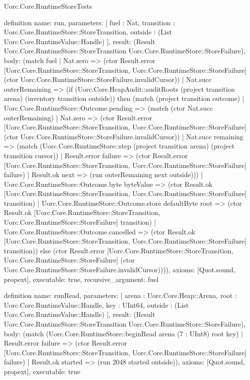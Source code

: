 \begin{lexlean}{Uorc.Core.RuntimeStoreTests}
\begin{semanticmodule}
definition{
  name: run,
  parameters: [
    fuel : Nat,
    transition : Uorc.Core.RuntimeStore::StoreTransition,
    outside : (List Uorc.Core.RuntimeValue::Handle)
  ],
  result: (Result Uorc.Core.RuntimeStore::StoreTransition Uorc.Core.RuntimeStore::StoreFailure),
  body: (match fuel
    | Nat.zero => (ctor Result.error [Uorc.Core.RuntimeStore::StoreTransition, Uorc.Core.RuntimeStore::StoreFailure] (ctor Uorc.Core.RuntimeStore::StoreFailure.invalidCursor))
    | Nat.succ outerRemaining => (if (Uorc.Core.HeapAudit::auditRoots (project transition arena) (inventory transition outside)) then (match (project transition outcome)
      | Uorc.Core.RuntimeStore::Outcome.pending => (match (ctor Nat.succ outerRemaining)
        | Nat.zero => (ctor Result.error [Uorc.Core.RuntimeStore::StoreTransition, Uorc.Core.RuntimeStore::StoreFailure] (ctor Uorc.Core.RuntimeStore::StoreFailure.invalidCursor))
        | Nat.succ remaining => (match (Uorc.Core.RuntimeStore::step (project transition arena) (project transition cursor))
          | Result.error failure => (ctor Result.error [Uorc.Core.RuntimeStore::StoreTransition, Uorc.Core.RuntimeStore::StoreFailure] failure)
          | Result.ok next => (run outerRemaining next outside)))
      | Uorc.Core.RuntimeStore::Outcome.byte byteValue => (ctor Result.ok [Uorc.Core.RuntimeStore::StoreTransition, Uorc.Core.RuntimeStore::StoreFailure] transition)
      | Uorc.Core.RuntimeStore::Outcome.store defaultByte root => (ctor Result.ok [Uorc.Core.RuntimeStore::StoreTransition, Uorc.Core.RuntimeStore::StoreFailure] transition)
      | Uorc.Core.RuntimeStore::Outcome.cancelled => (ctor Result.ok [Uorc.Core.RuntimeStore::StoreTransition, Uorc.Core.RuntimeStore::StoreFailure] transition)) else (ctor Result.error [Uorc.Core.RuntimeStore::StoreTransition, Uorc.Core.RuntimeStore::StoreFailure] (ctor Uorc.Core.RuntimeStore::StoreFailure.invalidCursor)))),
  axioms: [Quot.sound, propext],
  executable: true,
  recursive_argument: fuel
}

definition{
  name: runRead,
  parameters: [
    arena : Uorc.Core.Heap::Arena,
    root : Uorc.Core.RuntimeValue::Handle,
    key : UInt64,
    outside : (List Uorc.Core.RuntimeValue::Handle)
  ],
  result: (Result Uorc.Core.RuntimeStore::StoreTransition Uorc.Core.RuntimeStore::StoreFailure),
  body: (match (Uorc.Core.RuntimeStore::beginRead arena (7 : UInt8) root key)
    | Result.error failure => (ctor Result.error [Uorc.Core.RuntimeStore::StoreTransition, Uorc.Core.RuntimeStore::StoreFailure] failure)
    | Result.ok started => (run 2048 started outside)),
  axioms: [Quot.sound, propext],
  executable: true
}


\end{semanticmodule}
\end{lexlean}
